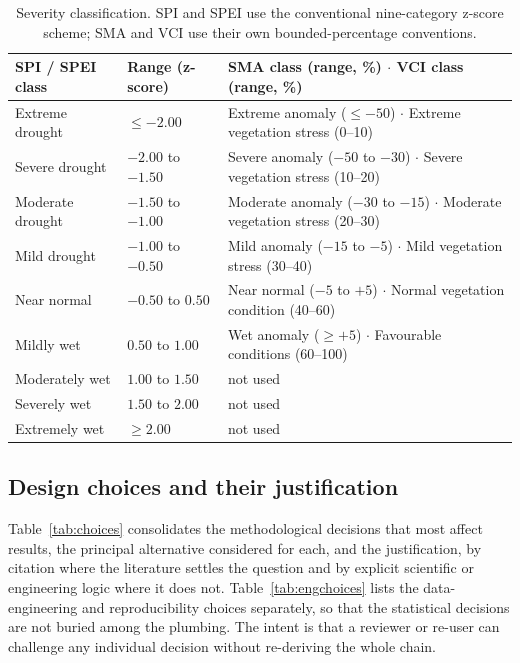 \documentclass[10pt,a4paper]{article}
\begin{document}
\begin{table}[t]
\caption{Severity classification. SPI and SPEI use the conventional nine-category z-score scheme; SMA and VCI use their own bounded-percentage conventions.}
\label{tab:classes}
\small
\begin{tabularx}{\textwidth}{@{}l l X@{}}
\toprule
SPI / SPEI class & Range (z-score) & SMA class (range, \%) $\cdot$ VCI class (range, \%) \\
\midrule
Extreme drought & $\le -2.00$ & Extreme anomaly ($\le -50$) $\cdot$ Extreme vegetation stress (0--10) \\
Severe drought & $-2.00$ to $-1.50$ & Severe anomaly ($-50$ to $-30$) $\cdot$ Severe vegetation stress (10--20) \\
Moderate drought & $-1.50$ to $-1.00$ & Moderate anomaly ($-30$ to $-15$) $\cdot$ Moderate vegetation stress (20--30) \\
Mild drought & $-1.00$ to $-0.50$ & Mild anomaly ($-15$ to $-5$) $\cdot$ Mild vegetation stress (30--40) \\
Near normal & $-0.50$ to $0.50$ & Near normal ($-5$ to $+5$) $\cdot$ Normal vegetation condition (40--60) \\
Mildly wet & $0.50$ to $1.00$ & Wet anomaly ($\ge +5$) $\cdot$ Favourable conditions (60--100) \\
Moderately wet & $1.00$ to $1.50$ & not used \\
Severely wet & $1.50$ to $2.00$ & not used \\
Extremely wet & $\ge 2.00$ & not used \\
\bottomrule
\end{tabularx}
\end{table}

\subsection*{Design choices and their justification}
Table~\ref{tab:choices} consolidates the methodological decisions that most affect results, the principal alternative considered for each, and the justification, by citation where the literature settles the question and by explicit scientific or engineering logic where it does not. Table~\ref{tab:engchoices} lists the data-engineering and reproducibility choices separately, so that the statistical decisions are not buried among the plumbing. The intent is that a reviewer or re-user can challenge any individual decision without re-deriving the whole chain.
\end{document}
